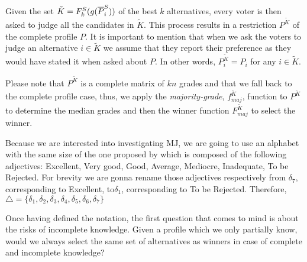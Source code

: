 \documentclass[version=3.21, pagesize, twoside=off, bibliography=totoc, DIV=calc, fontsize=12pt, a4paper]{scrartcl}
\begin{document}
Given the set $\tilde{K}=F^S_k(g(\overline{P}^S_i))$ of the best $k$ alternatives, every voter is then asked to judge all the candidates in $\tilde{K}$. 
This process results in a restriction $P^{\tilde{K}}$ of the complete profile $P$. It is important to mention that when we ask the voters to judge an alternative $i\in \tilde{K}$ we assume that they report their preference as they would have stated it when asked about $P$. In other words, $P^{\tilde{K}}_{i} = P_i$ for any $i \in \tilde{K}$.

Please note that $P^{\tilde{K}}$ is a complete matrix of $kn$ grades and that we fall back to the complete profile case, thus, we apply the \emph{majority-grade}, $f^{\tilde{K}}_{maj}$, function to $P^{\tilde{K}}$ to determine the median grades and then the winner function $F^{\tilde{K}}_{maj}$ to select the winner. 

\begin{remark}
	Because we are interested into investigating \acs{MJ}, we are going to use an alphabet with the same size of the one proposed by \citet{Balinski2011} which is composed of the following adjectives: Excellent, Very good, Good, Average, Mediocre, Inadequate, To be Rejected. For brevity we are gonna rename those adjectives respectively from $\delta_7$, corresponding to Excellent, to$\delta_1$, corresponding to To be Rejected. Therefore, $\triangle=\{\delta_1,\delta_2, \delta_3,\delta_4,\delta_5,\delta_6,\delta_7\}$ 
\end{remark}

Once having defined the notation, the first question that comes to mind is about the risks of incomplete knowledge. Given a profile which we only partially know, would we always select the same set of alternatives as winners in case of complete and incomplete knowledge?
\end{document}
